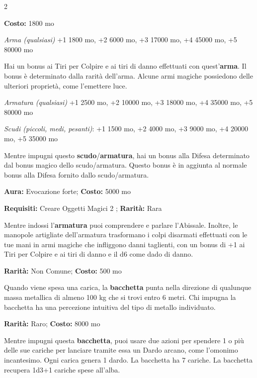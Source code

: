 \begin{multicols}{2}

\textbf{Costo:} 1800 mo

\emph{Arma (qualsiasi)} +1 1800 mo, +2 6000 mo, +3 17000 mo, +4 45000 mo, +5 80000 mo

Hai un bonus ai Tiri per Colpire e ai tiri di danno effettuati con quest'\textbf{arma}. Il bonus è determinato dalla rarità dell'arma. Alcune armi magiche possiedono delle ulteriori proprietà, come l'emettere luce.


\emph{Armatura (qualsiasi)} +1 2500 mo, +2 10000 mo, +3 18000 mo, +4 35000 mo, +5 80000 mo

\emph{Scudi (piccoli, medi, pesanti)}: +1 1500 mo, +2 4000 mo, +3 9000 mo, +4 20000 mo, +5 35000 mo

Mentre impugni questo \textbf{scudo}/\textbf{armatura}, hai un bonus alla Difesa determinato dal bonus magico dello scudo/armatura. Questo bonus è in aggiunta al normale bonus alla Difesa fornito dallo scudo/armatura.


\textbf{Aura:} Evocazione forte; \textbf{Costo:} 5000 mo

\textbf{Requisiti:} Creare Oggetti Magici 2 ; \textbf{Rarità:} Rara

Mentre indossi l'\textbf{armatura} puoi comprendere e parlare l'Abissale. Inoltre, le manopole artigliate dell'armatura trasformano i colpi disarmati effettuati con le tue mani in armi magiche che infliggono danni taglienti, con un bonus di +1 ai Tiri per Colpire e ai tiri di danno e il d6 come dado di danno.


\textbf{Rarità:} Non Comune; \textbf{Costo:} 500 mo

Quando viene spesa una carica, la \textbf{bacchetta} punta nella direzione di qualunque massa metallica di almeno 100 kg che si trovi entro 6 metri. Chi impugna la bacchetta ha una percezione intuitiva del tipo di metallo individuato.


\textbf{Rarità:} Raro; \textbf{Costo:} 8000 mo

Mentre impugni questa \textbf{bacchetta}, puoi usare due azioni per spendere 1 o più delle sue cariche per lanciare tramite essa un Dardo arcano, come l'omonimo incantesimo. Ogni carica genera 1 dardo. La bacchetta ha 7 cariche. La bacchetta recupera 1d3+1 cariche spese all'alba.


\end{multicols}
